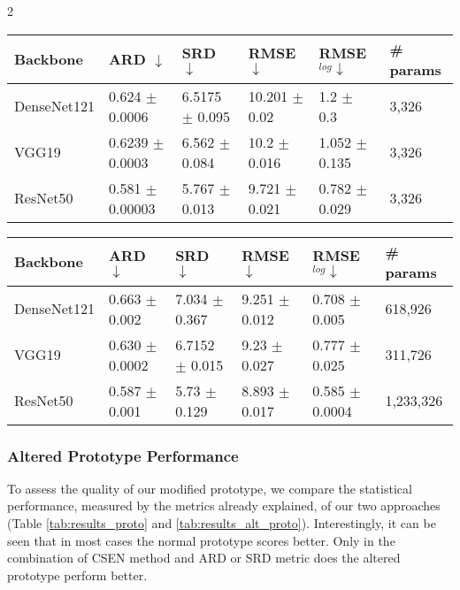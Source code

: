\documentclass[a4paper, 11pt]{article}
\begin{document}
\begin{multicols}{2}
\begin{table*}
\centering
\begin{subtable}[c]{\linewidth}
\centering
{}
\footnotesize
    \begin{tabular}{|l|l|l|l|l|l|}
    \hline
        Backbone & ARD $\downarrow$ & SRD $\downarrow$ & RMSE  $\downarrow$ & RMSE$_{log} \downarrow$ & \# params \\ \hline
        DenseNet121 & 0.624 $\pm$ 0.0006 & 6.5175 $\pm$ 0.095 & 10.201 $\pm$ 0.02 & 1.2 $\pm$ 0.3 & 3,326 \\
        VGG19 & 0.6239 $\pm$ 0.0003 & 6.562 $\pm$ 0.084 & 10.2 $\pm$ 0.016 & 1.052 $\pm$ 0.135 & 3,326 \\
        ResNet50 & 0.581 $\pm$ 0.00003 & 5.767 $\pm$ 0.013 & 9.721 $\pm$ 0.021 & 0.782 $\pm$ 0.029 & 3,326 \\
        \hline
    \end{tabular}
\label{tab:altered_prototype_results_csen}
\end{subtable}
\vspace{25pt}
\begin{subtable}[c]{\linewidth}
\centering
{}
\footnotesize
    \begin{tabular}{|l|l|l|l|l|l|}
    \hline
        Backbone & ARD $\downarrow$ & SRD $\downarrow$ & RMSE  $\downarrow$ & RMSE$_{log} \downarrow$ & \# params \\ \hline
        DenseNet121 & 0.663 $\pm$ 0.002 & 7.034 $\pm$ 0.367 &9.251 $\pm$ 0.012 & 0.708 $\pm$ 0.005 & 618,926\\
        VGG19 & 0.630 $\pm$ 0.0002 & 6.7152 $\pm$ 0.015 & 9.23 $\pm$ 0.027 & 0.777 $\pm$ 0.025 & 311,726 \\
        ResNet50 & 0.587 $\pm$ 0.001 & 5.73 $\pm$ 0.129 & 8.893 $\pm$ 0.017 & 0.585 $\pm$ 0.0004 & 1,233,326 \\
        \hline
    \end{tabular}
    \label{tab:altered_prototype_results_clcsen}
\end{subtable}
\caption{Altered Prototype - Statistical performances for CSEN and CL-CSEN methods on the backbones for the altered prototype}
\label{tab:results_alt_proto}
\end{table*}

\subsubsection{Altered Prototype Performance}\label{sec:altered_prototype_performance}
\begin{flushleft}
To assess the quality of our modified prototype, we compare the statistical performance, measured by the metrics already explained, of our two approaches (Table \ref{tab:results_proto} and \ref{tab:results_alt_proto}). Interestingly, it can be seen that in most cases the normal prototype scores better. Only in the combination of CSEN method and ARD or SRD metric does the altered prototype perform better. 


\end{flushleft}
\end{multicols}
\end{document}
